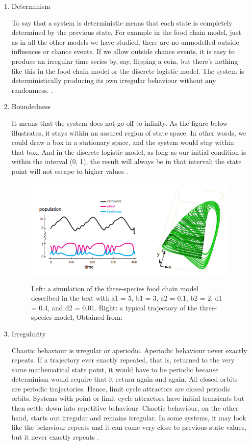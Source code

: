 \documentclass[11pt, letterpaper, english]{article}
\begin{document}
    \begin{enumerate}
        \item Determinism
    \par{To say that a system is deterministic means that each state is completely determined by the previous state. 
    For example in the food chain model, just as in all the other models we have studied, there are no unmodelled outside influences or chance events. If we allow outside chance events, it is easy to produce an irregular time series by, say, flipping a coin, but there’s nothing like this in the food chain model or the discrete logistic model. The system is deterministically producing its own irregular behaviour without any randomness. \cite{garfinkel_shevtsov_guo_2017}.}

    \item{Boundedness}

    \par{It means that the system does not go off to infinity. As the figure below illustrates, it stays within an assured region of state space. In other words, we could draw a box in a stationary space, and the system would stay within that box. And in the discrete logistic model, as long as our initial condition is within the interval (0, 1), the result will always be in that interval; the state point will not escape to higher values \cite{garfinkel_shevtsov_guo_2017}.}
    
    \begin{figure}[ht]
	    \centering
		\includegraphics[width=0.7 \textwidth]{Chaos.png}
		\label{Imagen_1}
		\caption{Left: a simulation of the three-species food chain model described in the text with a1 = 5, b1 = 3, a2 = 0.1, b2 = 2, d1 = 0.4, and d2 = 0.01. Right: a typical trajectory of the three-species model, Obtained from: \cite{garfinkel_shevtsov_guo_2017}}
	\end{figure}

	\item{Irregularity}
	
	\par{Chaotic behaviour is irregular or aperiodic. Aperiodic behaviour never exactly repeats. If a trajectory ever exactly repeated, that is, returned to the very same mathematical state point, it would have to be periodic because determinism would require that it return again and again. All closed orbits are periodic trajectories. Hence, limit cycle attractors are closed periodic orbits. Systems with point or limit cycle attractors have initial transients but then settle down into repetitive behaviour. Chaotic behaviour, on the other hand, starts out irregular and remains irregular. In some systems, it may look like the behaviour repeats and it can come very close to previous state values, but it never exactly repeats \cite{garfinkel_shevtsov_guo_2017}.}


\end{enumerate}
\end{document}
